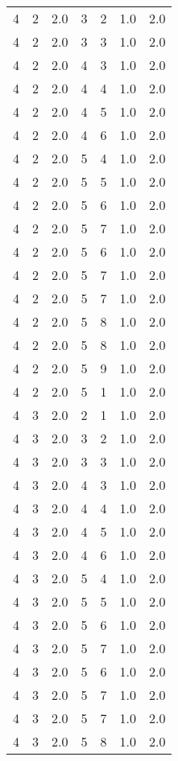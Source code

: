 \documentclass[a4paper,12pt]{article}
\begin{document}
\begin{center}
\begin{longtable}{ c c c | c c c | c }
        4 & 2 & 2.0 & 3 & 2 & 1.0 & 2.0 \\
        4 & 2 & 2.0 & 3 & 3 & 1.0 & 2.0 \\
        4 & 2 & 2.0 & 4 & 3 & 1.0 & 2.0 \\
        4 & 2 & 2.0 & 4 & 4 & 1.0 & 2.0 \\
        4 & 2 & 2.0 & 4 & 5 & 1.0 & 2.0 \\
        4 & 2 & 2.0 & 4 & 6 & 1.0 & 2.0 \\
        4 & 2 & 2.0 & 5 & 4 & 1.0 & 2.0 \\
        4 & 2 & 2.0 & 5 & 5 & 1.0 & 2.0 \\
        4 & 2 & 2.0 & 5 & 6 & 1.0 & 2.0 \\
        4 & 2 & 2.0 & 5 & 7 & 1.0 & 2.0 \\
        4 & 2 & 2.0 & 5 & 6 & 1.0 & 2.0 \\
        4 & 2 & 2.0 & 5 & 7 & 1.0 & 2.0 \\
        4 & 2 & 2.0 & 5 & 7 & 1.0 & 2.0 \\
        4 & 2 & 2.0 & 5 & 8 & 1.0 & 2.0 \\
        4 & 2 & 2.0 & 5 & 8 & 1.0 & 2.0 \\
        4 & 2 & 2.0 & 5 & 9 & 1.0 & 2.0 \\
        4 & 2 & 2.0 & 5 & 1 & 1.0 & 2.0 \\
        4 & 3 & 2.0 & 2 & 1 & 1.0 & 2.0 \\
        4 & 3 & 2.0 & 3 & 2 & 1.0 & 2.0 \\
        4 & 3 & 2.0 & 3 & 3 & 1.0 & 2.0 \\
        4 & 3 & 2.0 & 4 & 3 & 1.0 & 2.0 \\
        4 & 3 & 2.0 & 4 & 4 & 1.0 & 2.0 \\
        4 & 3 & 2.0 & 4 & 5 & 1.0 & 2.0 \\
        4 & 3 & 2.0 & 4 & 6 & 1.0 & 2.0 \\
        4 & 3 & 2.0 & 5 & 4 & 1.0 & 2.0 \\
        4 & 3 & 2.0 & 5 & 5 & 1.0 & 2.0 \\
        4 & 3 & 2.0 & 5 & 6 & 1.0 & 2.0 \\
        4 & 3 & 2.0 & 5 & 7 & 1.0 & 2.0 \\
        4 & 3 & 2.0 & 5 & 6 & 1.0 & 2.0 \\
        4 & 3 & 2.0 & 5 & 7 & 1.0 & 2.0 \\
        4 & 3 & 2.0 & 5 & 7 & 1.0 & 2.0 \\
        4 & 3 & 2.0 & 5 & 8 & 1.0 & 2.0 \\

\end{longtable}
\end{center}
\end{document}
